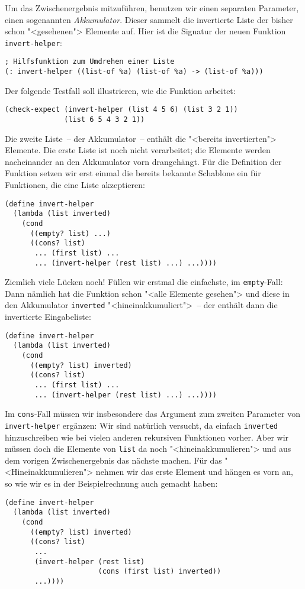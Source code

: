 Um das Zwischenergebnis mitzuführen, 
benutzen wir einen separaten Parameter, einen sogenannten
\textit{Akkumulator}.  Dieser sammelt die
invertierte Liste der bisher schon "<gesehenen"> Elemente auf.  Hier
ist die Signatur der neuen Funktion \lstinline{invert-helper}:
%
\begin{lstlisting}
; Hilfsfunktion zum Umdrehen einer Liste
(: invert-helper ((list-of %a) (list-of %a) -> (list-of %a)))
\end{lstlisting}
%
Der folgende Testfall soll illustrieren, wie die Funktion arbeitet:
\begin{lstlisting}
(check-expect (invert-helper (list 4 5 6) (list 3 2 1))
              (list 6 5 4 3 2 1))
\end{lstlisting}
%
Die zweite Liste~-- der Akkumulator~-- enthält die "<bereits
invertierten"> Elemente.  Die erste Liste ist noch nicht verarbeitet;
die Elemente werden nacheinander an den Akkumulator vorn drangehängt.
Für die Definition der Funktion setzen wir erst einmal die bereits
bekannte Schablone ein für Funktionen, die eine Liste akzeptieren:
%
\begin{lstlisting}
(define invert-helper
  (lambda (list inverted)
    (cond
      ((empty? list) ...)
      ((cons? list)
       ... (first list) ...
       ... (invert-helper (rest list) ...) ...))))
\end{lstlisting}
%
Ziemlich viele Lücken noch!  Füllen wir erstmal die einfachste, im
\lstinline{empty}-Fall: Dann nämlich hat die Funktion schon "<alle
Elemente gesehen"> und diese in den Akkumulator \lstinline{inverted}
"<hineinakkumuliert">~-- der enthält dann die invertierte
Eingabeliste:
%
\begin{lstlisting}
(define invert-helper
  (lambda (list inverted)
    (cond
      ((empty? list) inverted)
      ((cons? list)
       ... (first list) ...
       ... (invert-helper (rest list) ...) ...))))
\end{lstlisting}
%
Im \lstinline{cons}-Fall müssen wir insbesondere das Argument zum zweiten
Parameter von \lstinline{invert-helper} ergänzen: Wir sind natürlich
versucht, da einfach \lstinline{inverted} hinzuschreiben wie bei
vielen anderen rekursiven Funktionen vorher.  Aber wir müssen doch die
Elemente von \lstinline{list} da noch "<hineinakkumulieren"> und aus
dem vorigen Zwischenergebnis das nächste machen.  Für das
"<Hineinakkumulieren"> nehmen wir das erste Element und hängen es
vorn an, so wie wir es in der Beispielrechnung auch gemacht haben:
%
\begin{lstlisting}
(define invert-helper
  (lambda (list inverted)
    (cond
      ((empty? list) inverted)
      ((cons? list)
       ...
       (invert-helper (rest list)
                      (cons (first list) inverted))
       ...))))
\end{lstlisting}
